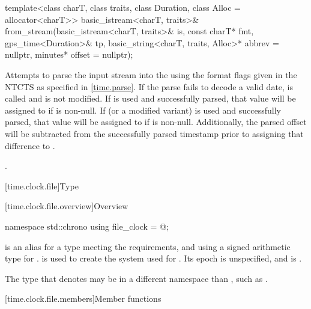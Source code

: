 %
\begin{itemdecl}
template<class charT, class traits, class Duration, class Alloc = allocator<charT>>
  basic_istream<charT, traits>&
    from_stream(basic_istream<charT, traits>& is, const charT* fmt,
                gps_time<Duration>& tp, basic_string<charT, traits, Alloc>* abbrev = nullptr,
                minutes* offset = nullptr);
\end{itemdecl}

\begin{itemdescr}
\pnum
\effects
Attempts to parse the input stream 
into the   using
the format flags given in the NTCTS 
as specified in \ref{time.parse}.
If the parse fails to decode a valid date,
 is called and
 is not modified.
If  is used and successfully parsed,
that value will be assigned to  if  is non-null.
If  (or a modified variant) is used and successfully parsed,
that value will be assigned to  if  is non-null.
Additionally, the parsed offset will be subtracted from
the successfully parsed timestamp prior to assigning that difference to .

\pnum
\returns
{}.
\end{itemdescr}

[time.clock.file]{Type }

[time.clock.file.overview]{Overview}
%

\begin{codeblock}
namespace std::chrono {
  using file_clock = @\seebelow@;
}
\end{codeblock}

\pnum
{} is an alias for a type
meeting the  requirements, and
using a signed arithmetic type for .
 is used to create the  system
used for .
Its epoch is unspecified, and
 is .
\begin{note}
The type that  denotes may be
in a different namespace than ,
such as .
\end{note}

[time.clock.file.members]{Member functions}

